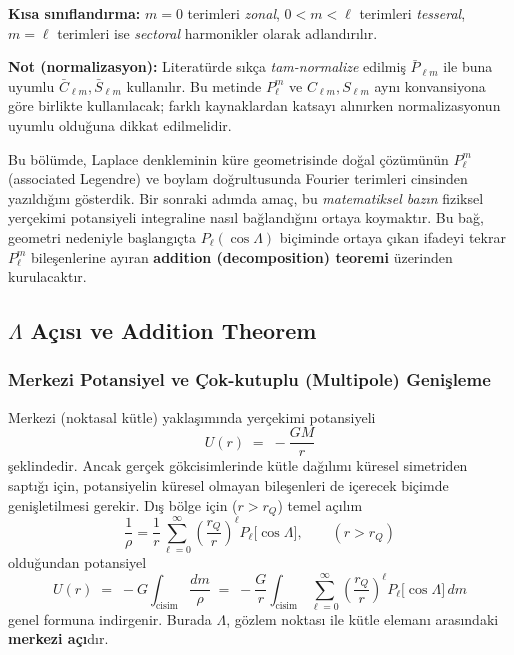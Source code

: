 \medskip
\noindent
\textbf{Kısa sınıflandırma:} $m=0$ terimleri \emph{zonal}, $0<m<\ell$ terimleri \emph{tesseral},
$m=\ell$ terimleri ise \emph{sectoral} harmonikler olarak adlandırılır.

\medskip
\noindent
\textbf{Not (normalizasyon):} Literatürde sıkça \emph{tam-normalize} edilmiş
$\bar P_{\ell m}$ ile buna uyumlu $\bar C_{\ell m},\bar S_{\ell m}$ kullanılır.
Bu metinde $P_\ell^m$ ve $C_{\ell m},S_{\ell m}$ aynı konvansiyona göre birlikte kullanılacak;
farklı kaynaklardan katsayı alınırken normalizasyonun uyumlu olduğuna dikkat edilmelidir.

\medskip
\noindent
Bu bölümde, Laplace denkleminin küre geometrisinde doğal çözümünün
$P_\ell^m$ (associated Legendre) ve boylam doğrultusunda Fourier terimleri
cinsinden yazıldığını gösterdik. Bir sonraki adımda amaç, bu \emph{matematiksel bazın}
fiziksel yerçekimi potansiyeli integraline nasıl bağlandığını ortaya koymaktır.
Bu bağ, geometri nedeniyle başlangıçta $P_\ell(\cos\Lambda)$ biçiminde ortaya çıkan
ifadeyi tekrar $P_\ell^m$ bileşenlerine ayıran \textbf{addition (decomposition) teoremi}
üzerinden kurulacaktır.

\subsection{$\Lambda$ Açısı ve Addition Theorem}
\label{subsec:lambda_addition}

\subsubsection{Merkezi Potansiyel ve Çok-kutuplu (Multipole) Genişleme}

Merkezi (noktasal kütle) yaklaşımında yerçekimi potansiyeli
\begin{equation}
U(r) \;=\; - \frac{GM}{r}
\label{eq:central_potential}
\end{equation}
şeklindedir. Ancak gerçek gökcisimlerinde kütle dağılımı küresel simetriden saptığı için,
potansiyelin küresel olmayan bileşenleri de içerecek biçimde genişletilmesi gerekir.
Dış bölge için ($r>r_Q$) temel açılım
\begin{equation}
\frac{1}{\rho}
=
\frac{1}{r}\sum_{\ell=0}^{\infty}\left(\frac{r_Q}{r}\right)^\ell P_\ell\!\bigl[\cos\Lambda\bigr],
\qquad (r>r_Q)
\label{eq:inv_rho_legendre}
\end{equation}
olduğundan potansiyel
\begin{equation}
U(r)
\;=\;
- G\int_{\text{cisim}}\frac{dm}{\rho}
\;=\;
-\frac{G}{r}\int_{\text{cisim}}
\sum_{\ell=0}^{\infty}\left(\frac{r_Q}{r}\right)^\ell P_\ell\!\bigl[\cos\Lambda\bigr]\, dm
\label{eq:potential_legendre_expansion}
\end{equation}
genel formuna indirgenir. Burada $\Lambda$, gözlem noktası ile kütle elemanı arasındaki \textbf{merkezi açı}dır.

